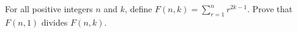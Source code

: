 For all positive integers $n$ and $k$,  define $F(n,k) = \sum_{r = 1}^n r^{2k - 1}$.  Prove that $F(n,1)$ divides $F(n,k)$.